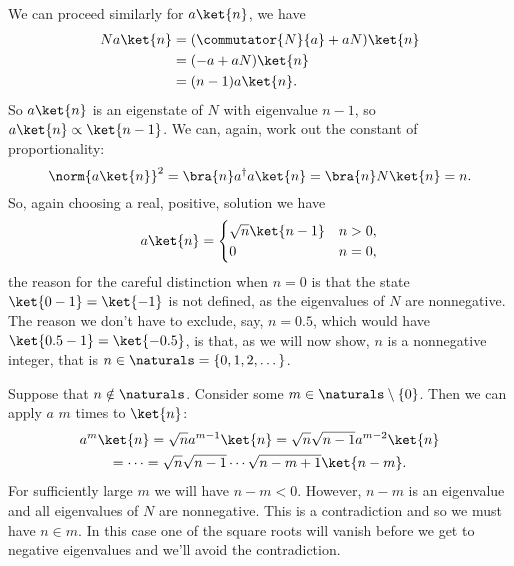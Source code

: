 \documentclass[fleqn]{NotesClass}
\newcommand{\hermit}{{\dagger}}
\begin{document}
    We can proceed similarly for \(a\ket{n}\), we have
    \begin{align}
        N a \ket{n} &= (\commutator{N}{a} + aN)\ket{n}\\
        &= (-a + aN)\ket{n}\\
        &= (n - 1)a \ket{n}.
    \end{align}
    So \(a\ket{n}\) is an eigenstate of \(N\) with eigenvalue \(n - 1\), so \(a\ket{n} \propto \ket{n - 1}\).
    We can, again, work out the constant of proportionality:
    \begin{equation}
        \norm{a\ket{n}}^2 = \bra{n} a^\hermit a \ket{n} = \bra{n} N \ket{n} = n.
    \end{equation}
    So, again choosing a real, positive, solution we have
    \begin{equation}
        a\ket{n} = 
        \begin{cases}
            \sqrt{n}\ket{n - 1} & n > 0,\\
            0 & n = 0,
        \end{cases}
    \end{equation}
    the reason for the careful distinction when \(n = 0\) is that the state \(\ket{0 - 1} = \ket{-1}\) is not defined, as the eigenvalues of \(N\) are nonnegative.
    The reason we don't have to exclude, say, \(n = 0.5\), which would have \(\ket{0.5 - 1} = \ket{-0.5}\), is that, as we will now show, \(n\) is a nonnegative integer, that is \(n \in \naturals = \{0, 1, 2, \dotsc\}\).
    
    Suppose that \(n \notin \naturals\).
    Consider some \(m \in \naturals \setminus \{0\}\).
    Then we can apply \(a\) \(m\) times to \(\ket{n}\):
    \begin{multline}
        a^m \ket{n} = \sqrt{n} a^{m - 1}\ket{n} = \sqrt{n}\sqrt{n - 1} a^{m - 2} \ket{n}\\
        = \dotsb = \sqrt{n} \sqrt{n - 1} \dotsm \sqrt{n - m + 1} \ket{n - m}.
    \end{multline}
    For sufficiently large \(m\) we will have \(n - m < 0\).
    However, \(n - m\) is an eigenvalue and all eigenvalues of \(N\) are nonnegative.
    This is a contradiction and so we must have \(n \in m\).
    In this case one of the square roots will vanish before we get to negative eigenvalues and we'll avoid the contradiction.
    
\end{document}
